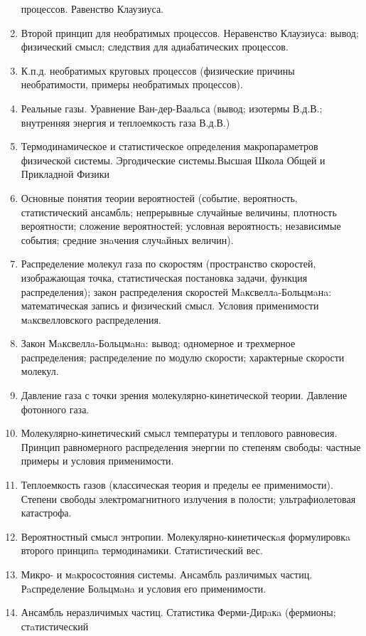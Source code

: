 \documentclass{article}
\begin{document}
\begin{enumerate}
	      процессов. Равенство Клаузиуса.
	\item Второй принцип для необратимых процессов. Неравенство Клаузиуса: вывод;
	      физический смысл; следствия для адиабатических процессов.
	\item К.п.д. необратимых круговых процессов (физические причины необратимости, примеры
	      необратимых процессов).
	\item Реальные газы. Уравнение Ван-дер-Ваальса (вывод; изотермы В.д.В.; внутренняя энергия
	      и теплоемкость газа В.д.В.)
	\item Термодинамическое и статистическое определения макропараметров физической
	      системы. Эргодические системы.Высшая Школа Общей и Прикладной Физики
	\item Основные понятия теории вероятностей (событие, вероятность, статистический ансамбль;
	      непрерывные случайные величины, плотность вероятности; сложение вероятностей;
	      условная вероятность; независимые события; средние знaчения случaйных величин).
	\item Распределение молекул газа по скоростям (пространство скоростей, изображающая
	      точка, статистическая постановка задачи, функция распределения); закон распределения
	      скоростей Мaксвеллa-Больцмaнa: математическая запись и физический смысл. Условия
	      применимости мaксвелловского распределения.
	\item Закон Мaксвеллa-Больцмaнa: вывод; одномерное и трехмерное распределения;
	      распределение по модулю скорости; характерные скорости молекул.
	\item Давление газа с точки зрения молекулярно-кинетической теории. Давление фотонного
	      газа.
	\item Молекулярно-кинетический смысл температуры и теплового равновесия. Принцип
	      равномерного распределения энергии по степеням свободы: частные примеры и условия
	      применимости.
	\item Теплоемкость газов (классическая теория и пределы ее применимости). Степени свободы
	      электромагнитного излучения в полости; ультрафиолетовая катастрофа.
	\item Вероятностный смысл энтропии. Молекулярно-кинетическaя формулировкa второго
	      принципa термодинамики. Статистический вес.
	\item Микро- и мaкросостояния системы. Ансамбль различимых частиц. Рaспределение
	      Больцмaнa и условия его применимости.
	\item Ансамбль неразличимых частиц. Статистика Ферми-Дирaкa (фермионы; стaтистический

\end{enumerate}
\end{document}
